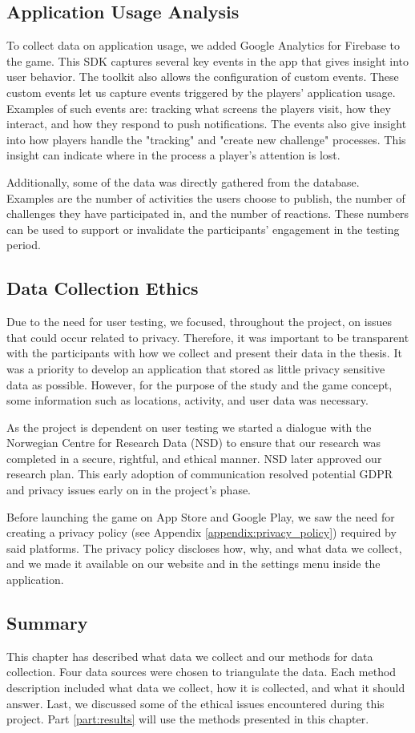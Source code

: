 \subsection{Application Usage Analysis}
To collect data on application usage, we added Google Analytics for Firebase to the game. This SDK captures several key events in the app that gives insight into user behavior. The toolkit also allows the configuration of custom events. These custom events let us capture events triggered by the players’ application usage. Examples of such events are: tracking what screens the players visit, how they interact, and how they respond to push notifications. The events also give insight into how players handle the "tracking" and "create new challenge" processes. This insight can indicate where in the process a player’s attention is lost.

Additionally, some of the data was directly gathered from the database. Examples are the number of activities the users choose to publish, the number of challenges they have participated in, and the number of reactions. These numbers can be used to support or invalidate the participants’ engagement in the testing period.

\subsection{Data Collection Ethics}
Due to the need for user testing, we focused, throughout the project, on issues that could occur related to privacy. Therefore, it was important to be transparent with the participants with how we collect and present their data in the thesis. It was a priority to develop an application that stored as little privacy sensitive data as possible. However, for the purpose of the study and the game concept, some information such as locations, activity, and user data was necessary.

As the project is dependent on user testing we started a dialogue with the Norwegian Centre for Research Data (NSD) to ensure that our research was completed in a secure, rightful, and ethical manner. NSD later approved our research plan. This early adoption of communication resolved potential GDPR and privacy issues early on in the project’s phase.

Before launching the game on App Store and Google Play, we saw the need for creating a privacy policy (see Appendix \ref{appendix:privacy_policy}) required by said platforms. The privacy policy discloses how, why, and what data we collect, and we made it available on our website and in the settings menu inside the application. 

\subsection{Summary}
This chapter has described what data we collect and our methods for data collection. Four data sources were chosen to triangulate the data. Each method description included what data we collect, how it is collected, and what it should answer. Last, we discussed some of the ethical issues encountered during this project. Part \ref{part:results} will use the methods presented in this chapter.